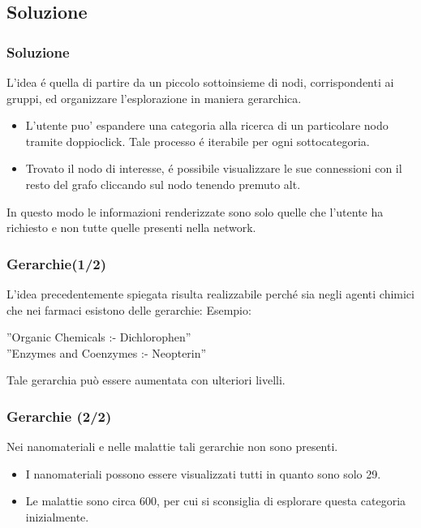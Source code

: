 \documentclass{beamer}
\begin{document}
\subsection{Soluzione}
\begin{frame}
\frametitle{Soluzione}
L'idea \'e quella di partire da un piccolo sottoinsieme di nodi, corrispondenti ai gruppi, ed organizzare l'esplorazione in maniera gerarchica. 
\begin{itemize}
\item L'utente puo' espandere una categoria alla ricerca di un particolare nodo tramite doppioclick. Tale processo \'e iterabile per ogni sottocategoria.
\item Trovato il nodo di interesse, \'e possibile visualizzare le sue connessioni con il resto del grafo cliccando sul nodo tenendo premuto alt.
\end{itemize}
\medskip
In questo modo le informazioni renderizzate sono solo quelle che l'utente ha richiesto e non tutte quelle presenti nella network. 
\end{frame}

\begin{frame}
\frametitle{Gerarchie(1/2)}
L'idea precedentemente spiegata risulta realizzabile perché sia negli agenti chimici che nei farmaci esistono delle gerarchie: Esempio:\\
\medskip
\begin{center}
''Organic Chemicals :- Dichlorophen''\\
''Enzymes and Coenzymes :- Neopterin''
\end{center}
Tale gerarchia può essere aumentata con ulteriori livelli. 
\end{frame}

\begin{frame}
\frametitle{Gerarchie (2/2)}
Nei nanomateriali e nelle malattie tali gerarchie non sono presenti.
\begin{itemize}
\item I nanomateriali possono essere visualizzati tutti in quanto sono solo 29.
\item Le malattie sono circa 600, per cui si sconsiglia di esplorare questa categoria inizialmente.
\end{itemize}
\medskip
\end{frame}
\end{document}
